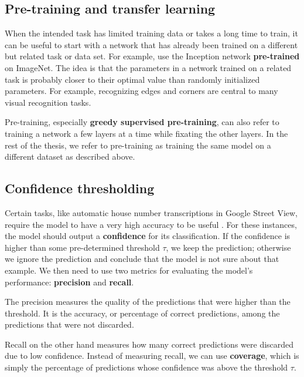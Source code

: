 \subsection{Pre-training and transfer learning}

When the intended task has limited training data or takes a long time to train, it can be useful to start with a network that has already been trained on a different but related task or data set.
For example, \cite{SpatialTransformerNetworks} use the Inception network \textbf{pre-trained} on ImageNet.
The idea is that the parameters in a network trained on a related task is probably closer to their optimal value than randomly initialized parameters. For example, recognizing edges and corners are central to many visual recognition tasks.

Pre-training, especially \textbf{greedy supervised pre-training}, can also refer to training a network a few layers at a time while fixating the other layers. In the rest of the thesis, we refer to pre-training as training the same model on a different dataset as described above.


\subsection{Confidence thresholding}


Certain tasks, like automatic house number transcriptions in Google Street View, require the model to have a very high accuracy to be useful \cite{multidigit_streetview}.
For these instances, the model should output a \textbf{confidence} for its classification. If the confidence is higher than some pre-determined threshold $\tau$, we keep the prediction; otherwise we ignore the prediction and conclude that the model is not sure about that example.
We then need to use two metrics for evaluating the model's performance: \textbf{precision} and \textbf{recall}.

The precision measures the quality of the predictions that were higher than the threshold. It is the accuracy, or percentage of correct predictions, among the predictions that were not discarded.

Recall on the other hand measures how many correct predictions were discarded due to low confidence. Instead of measuring recall, we can use \textbf{coverage}, which is simply the percentage of predictions whose confidence was above the threshold $\tau$.

